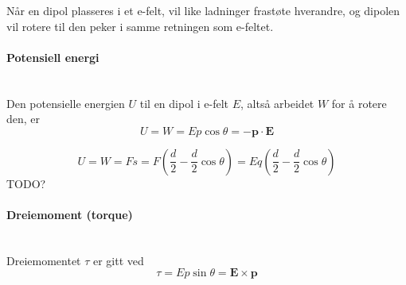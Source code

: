 Når en dipol plasseres i et e-felt, vil like ladninger frastøte hverandre,
og dipolen vil rotere til den peker i samme retningen som e-feltet.



\paragraph{Potensiell energi} \hfill \\
Den potensielle energien $U$ til en dipol i e-felt $E$, altså arbeidet $W$
for å rotere den, er
$$U = W = Ep\cos{\theta} = -\mathbf{p}\cdot\mathbf{E}$$

$$U = W
  = Fs
  = F\left(\frac{d}{2} - \frac{d}{2}\cos{\theta}\right)
  = Eq\left(\frac{d}{2} - \frac{d}{2}\cos{\theta}\right)$$
TODO?



\paragraph{Dreiemoment (torque)} \hfill \\
Dreiemomentet $\tau$ er gitt ved
$$\tau = Ep\sin{\theta} = \mathbf{E}\times\mathbf{p}$$
